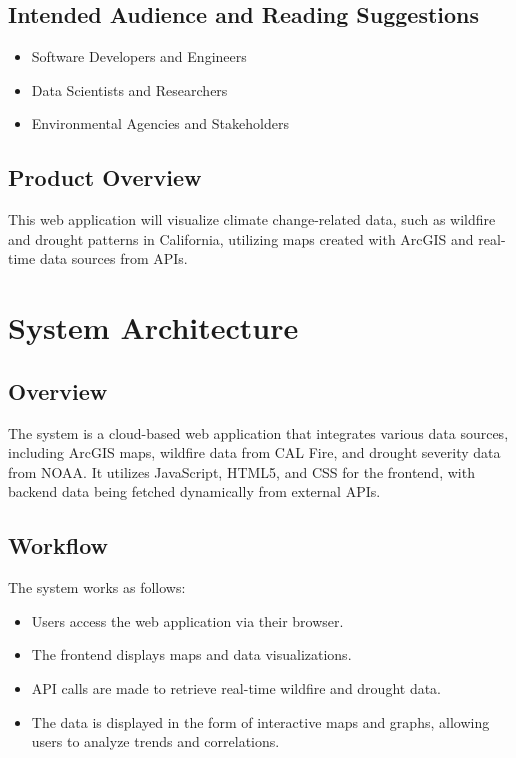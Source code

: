 \documentclass[12pt]{article}
\begin{document}
\subsection{Intended Audience and Reading Suggestions}
\begin{itemize}
  \item Software Developers and Engineers
  \item Data Scientists and Researchers
  \item Environmental Agencies and Stakeholders
\end{itemize}

\subsection{Product Overview}
This web application will visualize climate change-related data, such as wildfire and drought patterns in California, utilizing maps created with ArcGIS and real-time data sources from APIs.

\newpage
\section{System Architecture}
\subsection{Overview}
The system is a cloud-based web application that integrates various data sources, including ArcGIS maps, wildfire data from CAL Fire, and drought severity data from NOAA. It utilizes JavaScript, HTML5, and CSS for the frontend, with backend data being fetched dynamically from external APIs.

\subsection{Workflow}
The system works as follows:
\begin{itemize}
  \item Users access the web application via their browser.
  \item The frontend displays maps and data visualizations.
  \item API calls are made to retrieve real-time wildfire and drought data.
  \item The data is displayed in the form of interactive maps and graphs, allowing users to analyze trends and correlations.
\end{itemize}
\end{document}
